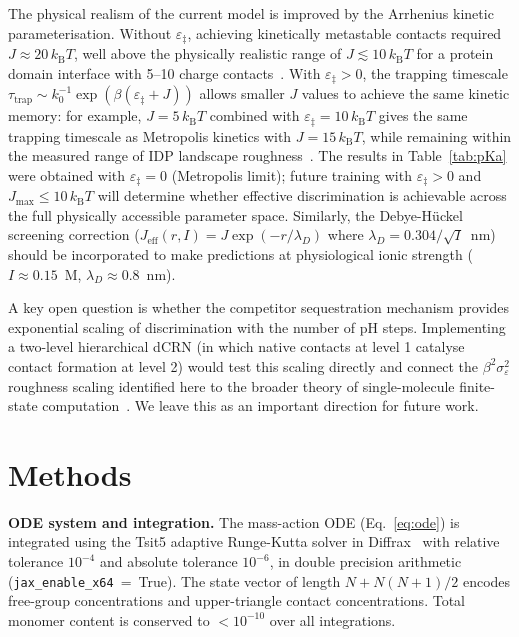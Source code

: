 \documentclass[10pt,twocolumn]{article}
\begin{document}
The physical realism of the current model is improved by the Arrhenius kinetic parameterisation.
Without $\varepsilon_\ddagger$, achieving kinetically metastable contacts required $J \approx 20\,k_\mathrm{B}T$, well above the physically realistic range of $J \lesssim 10\,k_\mathrm{B}T$ for a protein domain interface with 5--10 charge contacts~\cite{losdorfer2017}.
With $\varepsilon_\ddagger > 0$, the trapping timescale $\tau_\mathrm{trap} \sim k_0^{-1}\exp(\beta(\varepsilon_\ddagger + J))$ allows smaller $J$ values to achieve the same kinetic memory: for example, $J = 5\,k_\mathrm{B}T$ combined with $\varepsilon_\ddagger = 10\,k_\mathrm{B}T$ gives the same trapping timescale as Metropolis kinetics with $J = 15\,k_\mathrm{B}T$, while remaining within the measured range of IDP landscape roughness~\cite{hyeon2003}.
The results in Table~\ref{tab:pKa} were obtained with $\varepsilon_\ddagger = 0$ (Metropolis limit); future training with $\varepsilon_\ddagger > 0$ and $J_\mathrm{max} \leq 10\,k_\mathrm{B}T$ will determine whether effective discrimination is achievable across the full physically accessible parameter space.
Similarly, the Debye-Hückel screening correction ($J_\mathrm{eff}(r,I) = J\exp(-r/\lambda_D)$ where $\lambda_D = 0.304/\sqrt{I}$~nm) should be incorporated to make predictions at physiological ionic strength ($I \approx 0.15$~M, $\lambda_D \approx 0.8$~nm).

A key open question is whether the competitor sequestration mechanism provides exponential scaling of discrimination with the number of pH steps.
Implementing a two-level hierarchical dCRN (in which native contacts at level 1 catalyse contact formation at level 2) would test this scaling directly and connect the $\beta^2\sigma_\varepsilon^2$ roughness scaling identified here to the broader theory of single-molecule finite-state computation~\cite{zwanzig1988,bryngelson1987}.
We leave this as an important direction for future work.

\section{Methods}

\textbf{ODE system and integration.}
The mass-action ODE (Eq.~\ref{eq:ode}) is integrated using the Tsit5 adaptive Runge-Kutta solver in Diffrax~\cite{kidger2022} with relative tolerance $10^{-4}$ and absolute tolerance $10^{-6}$, in double precision arithmetic (\texttt{jax\_enable\_x64}~=~True).
The state vector of length $N + N(N+1)/2$ encodes free-group concentrations and upper-triangle contact concentrations.
Total monomer content is conserved to $<10^{-10}$ over all integrations.
\end{document}
